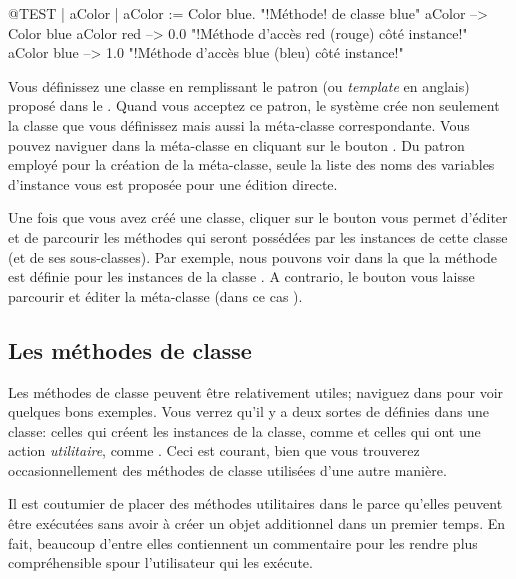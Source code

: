 \documentclass[a4paper,10pt,twoside]{book}
\begin{document}
\begin{code}{@TEST | aColor |}
aColor := Color blue.               "!M\'ethode! de classe blue"
aColor        --> Color blue
aColor red  --> 0.0         "!M\'ethode d'acc\`es red (rouge) c\^ot\'e instance!"
aColor blue --> 1.0        "!M\'ethode d'acc\`es blue (bleu) c\^ot\'e instance!"
\end{code}

Vous d\'efinissez une classe en remplissant le patron (ou \emph{template} en anglais) propos\'e
dans le .
Quand vous acceptez ce patron, le syst\`eme cr\'ee non seulement la classe
que vous d\'efinissez mais aussi la m\'eta-classe correspondante.
Vous pouvez naviguer dans la m\'eta-classe en cliquant sur le bouton .
Du patron employ\'e pour la cr\'eation de la m\'eta-classe, seule la
liste des noms des variables d'instance vous est propos\'ee pour une \'edition directe.  

Une fois que vous avez cr\'e\'e une classe, cliquer sur
le bouton  vous permet d'\'editer et de parcourir les
m\'ethodes qui seront poss\'ed\'ees par les instances de cette classe (et de ses sous-classes). Par exemple, nous pouvons voir dans la  que 
la m\'ethode  est d\'efinie pour les instances de la classe .
A contrario, le bouton  vous laisse parcourir et \'editer
la m\'eta-classe (dans ce cas ).

\subsection{Les m\'ethodes de classe} 

Les m\'ethodes de classe peuvent \^etre relativement utiles; naviguez dans  pour voir quelques bons exemples.
Vous verrez qu'il y a deux sortes de  d\'efinies dans une classe: celles qui cr\'eent les instances de la classe, comme  et celles qui ont une action \emph{utilitaire}, 
comme .
Ceci est courant, bien que vous trouverez occasionnellement des m\'ethodes
de classe utilis\'ees d'une autre mani\`ere.

Il est coutumier de placer des m\'ethodes utilitaires dans le  parce qu'elles peuvent \^etre ex\'ecut\'ees
sans avoir \`a cr\'eer un objet additionnel dans un premier temps.
En fait, beaucoup d'entre elles contiennent un commentaire pour les rendre plus compr\'ehensible spour l'utilisateur qui les ex\'ecute.
\end{document}
